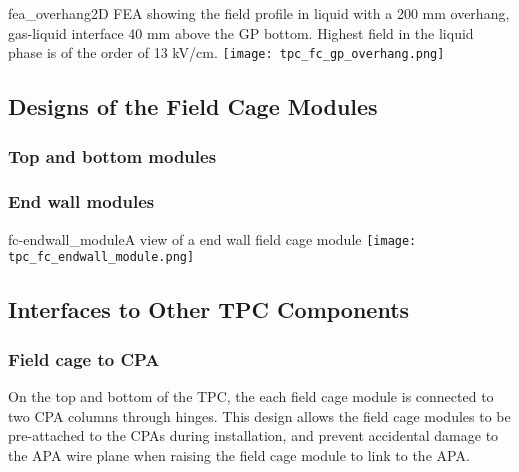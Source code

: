 \begin{cdrfigure}{fea_overhang}{2D FEA showing the field profile in liquid with a 200 mm overhang, gas-liquid interface 40 mm above the GP bottom. Highest field in the liquid phase is of the order of 13 kV/cm.}
\texttt{[image: tpc\_fc\_gp\_overhang.png]}
\end{cdrfigure}







\subsection{Designs of the Field Cage Modules}

\subsubsection{Top and bottom modules}




\subsubsection{End wall modules}

\begin{cdrfigure}{fc-endwall_module}{A view of a end wall field cage module}
\texttt{[image: tpc\_fc\_endwall\_module.png]}
\end{cdrfigure}


\subsection{Interfaces to Other TPC Components}

\subsubsection{Field cage to CPA}

On the top and bottom of the TPC, the each field cage module is connected to two CPA columns through hinges.  This design allows the field cage modules to be pre-attached to the CPAs during installation, and prevent accidental damage to the APA wire plane when raising the field cage module to link to the APA.

